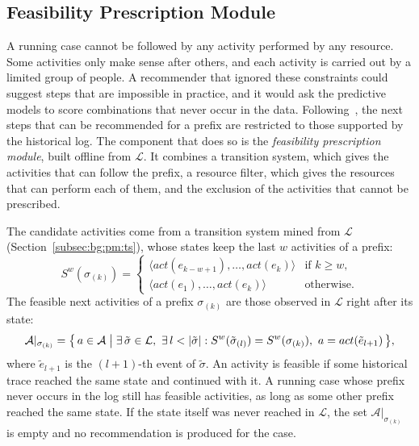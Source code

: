 \subsection{Feasibility Prescription Module}
\label{subsec:met:offline:feasible}
A running case cannot be followed by any activity performed by any resource.
Some activities only make sense after others, and each activity is carried
out by a limited group of people. A recommender that ignored these
constraints could suggest steps that are impossible in practice, and it
would ask the predictive models to score combinations that never occur in
the data. Following~\cite{le2025balancing}, the next steps that can be
recommended for a prefix are restricted to those supported by the
historical log. The component that does so is the \emph{feasibility
prescription module}, built offline from $\mathcal{L}$. It combines a
transition system, which gives the activities that can follow the prefix, a
resource filter, which gives the resources that can perform each of them,
and the exclusion of the activities that cannot be prescribed.

The candidate activities come from a transition system mined from
$\mathcal{L}$ (Section~\ref{subsec:bg:pm:ts}), whose states keep the last
$w$ activities of a prefix:
\begin{equation}
  S^{w}(\sigma_{(k)}) =
  \begin{cases}
    \langle act(e_{k-w+1}), \dots, act(e_k) \rangle & \text{if } k \ge w,\\
    \langle act(e_1), \dots, act(e_k) \rangle & \text{otherwise.}
  \end{cases}
  \label{eq:met:off:state}
\end{equation}
The feasible next activities of a prefix $\sigma_{(k)}$ are those observed
in $\mathcal{L}$ right after its state:
\begin{equation}
  \mathcal{A}|_{\sigma_{(k)}} = \bigl\{\, a \in \mathcal{A} \bigm| \exists\,
  \tilde\sigma \in \mathcal{L},\ \exists\, l < |\tilde\sigma| :
  S^{w}(\tilde\sigma_{(l)}) = S^{w}(\sigma_{(k)}),\ a = act(\tilde e_{l+1})
  \,\bigr\},
  \label{eq:met:off:feasible}
\end{equation}
where $\tilde e_{l+1}$ is the $(l+1)$-th event of $\tilde\sigma$. An
activity is feasible if some historical trace reached the same state and
continued with it. A running case whose prefix never occurs in the log
still has feasible activities, as long as some other prefix reached the
same state. If the state itself was never reached in $\mathcal{L}$, the set
$\mathcal{A}|_{\sigma_{(k)}}$ is empty and no recommendation is produced for
the case.

